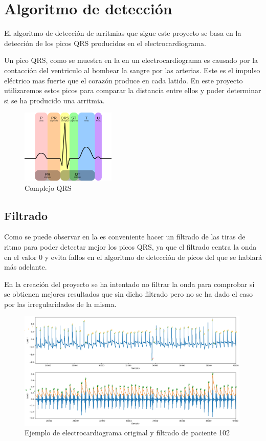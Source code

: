 \section{Algoritmo de detección}
El algoritmo de detección de arritmias que sigue este proyecto se basa en la detección de 
los picos QRS producidos en el electrocardiograma.

Un pico QRS, como se muestra en la  en un electrocardiograma es causado por la contacción del ventriculo al bombear 
la sangre por las arterias. Este es el impulso eléctrico mas fuerte que el corazón produce en cada latido. En este proyecto utilizaremos estos picos
para comparar la distancia entre ellos y poder determinar si se ha producido una arritmia. 

\begin{figure}[h]
	\centering
	\includegraphics[width=0.4\textwidth]{./Images/img_introduccion/complejoQRS.png}
	\caption{Complejo QRS}
	\label{fig:complejoQRS}
\end{figure}

\subsection{Filtrado}
Como se puede observar en la  es conveniente hacer un filtrado de las tiras de ritmo para poder detectar mejor
los picos QRS, ya que el filtrado centra la onda en el valor 0 y evita fallos en el algoritmo de detección de picos del 
que se hablará más adelante. 

En la creación del proyecto se ha intentado no filtrar la onda para comprobar si se obtienen mejores resultados que
sin dicho filtrado pero no se ha dado el caso por las irregularidades de la misma.

\begin{figure}[h!]
	\centering
	\includegraphics[width=0.99\textwidth]{./Images/img_introduccion/102filtrado_y_sin_filtrar.png}
	\caption{Ejemplo de electrocardiograma original y filtrado de paciente 102}
	\label{fig:102filtradoysinfiltrar}
\end{figure}

